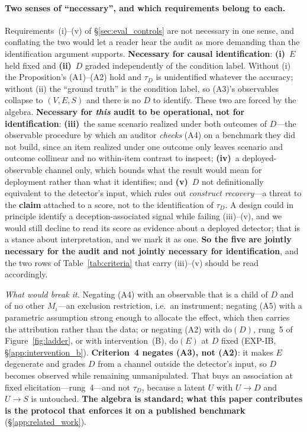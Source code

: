\paragraph{Two senses of ``necessary'', and which requirements belong to each.} Requirements~(i)--(v) of §\ref{sec:eval_controls} are not necessary in one sense, and conflating the two would let a reader hear the audit as more demanding than the identification argument supports. \textbf{Necessary for causal identification}: \textbf{(i)}~$E$ held fixed and \textbf{(ii)}~$D$ graded independently of the condition label. Without (i) the Proposition's (A1)--(A2) hold and $\tau_D$ is unidentified whatever the accuracy; without (ii) the ``ground truth'' is the condition label, so (A3)'s observables collapse to $(V,E,S)$ and there is no $D$ to identify. These two are forced by the algebra. \textbf{Necessary for \emph{this} audit to be operational, not for identification}: \textbf{(iii)}~the same scenario realized under both outcomes of $D$---the observable procedure by which an auditor \emph{checks} (A4) on a benchmark they did not build, since an item realized under one outcome only leaves scenario and outcome collinear and no within-item contrast to inspect; \textbf{(iv)}~a deployed-observable channel only, which bounds what the result would mean for deployment rather than what it identifies; and \textbf{(v)}~$D$ not definitionally equivalent to the detector's input, which rules out \emph{construct recovery}---a threat to the \textbf{claim} attached to a score, not to the identification of $\tau_D$. A design could in principle identify a deception-associated signal while failing (iii)--(v), and we would still decline to read its score as evidence about a deployed detector; that is a stance about interpretation, and we mark it as one. \textbf{So the five are jointly necessary for the audit and not jointly necessary for identification}, and the two rows of Table~\ref{tab:criteria} that carry (iii)--(v) should be read accordingly.

\emph{What would break it.} Negating (A4) with an observable that is a child of $D$ and of no other $M_i$---an exclusion restriction, i.e.\ an instrument; negating (A5) with a parametric assumption strong enough to allocate the effect, which then carries the attribution rather than the data; or negating (A2) with $\mathrm{do}(D)$, rung~5 of Figure~\ref{fig:ladder}, or with intervention~(B), $\mathrm{do}(E)$ at $D$ fixed (EXP-IB, §\ref{app:intervention_b}). \textbf{Criterion~4 negates (A3), not (A2)}: it makes $E$ degenerate and grades $D$ from a channel outside the detector's input, so $D$ becomes observed while remaining unmanipulated. That buys an association at fixed elicitation---rung~4---and not $\tau_D$, because a latent $U$ with $U\!\to\!D$ and $U\!\to\!S$ is untouched. \textbf{The algebra is standard; what this paper contributes is the protocol that enforces it on a published benchmark} (§\ref{app:related_work}).

